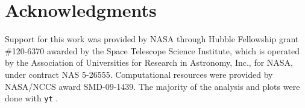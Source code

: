 \documentclass[useAMS,usenatbib,a4paper]{mn2e}
\begin{document}
\section*{Acknowledgments}

Support for this work was provided by NASA through Hubble Fellowship
grant \#120-6370 awarded by the Space Telescope Science Institute,
which is operated by the Association of Universities for Research in
Astronomy, Inc., for NASA, under contract NAS 5-26555.  Computational
resources were provided by NASA/NCCS award SMD-09-1439.  The majority
of the analysis and plots were done with \texttt{yt}
\citep{yt_full_paper}.



\bsp

\label{lastpage}
\end{document}
